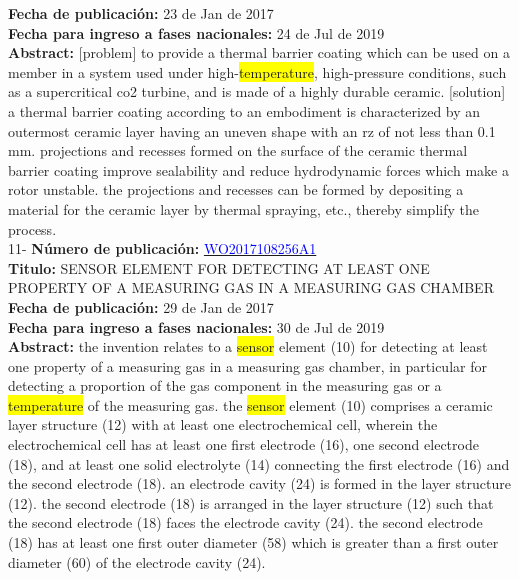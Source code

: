 \textbf{Fecha de publicación:} 23 de Jan de 2017\\ 
\textbf{Fecha para ingreso a fases nacionales:} 24 de Jul de 2019\\ 
\textbf{Abstract:} [problem] to provide a thermal barrier coating which can be used on a member in a system used under high-\colorbox{yellow}{temperature}, high-pressure conditions, such as a supercritical co2 turbine, and is made of a highly durable ceramic. [solution] a thermal barrier coating according to an embodiment is characterized by an outermost ceramic layer having an uneven shape with an rz of not less than 0.1 mm. projections and recesses formed on the surface of the ceramic thermal barrier coating improve sealability and reduce hydrodynamic forces which make a rotor unstable. the projections and recesses can be formed by depositing a material for the ceramic layer by thermal spraying, etc., thereby simplify the process.\\ 
 

 \vspace{1cm}11- \textbf{Número de publicación:} \href{https://worldwide.espacenet.com/publicationDetails/biblio?DB=EPODOC&II=0&ND=3&adjacent=true&locale=en_EP&FT=D&date=20160331&CC=WO&NR=2017108256A1&KC=A1#}{\textcolor{blue}{WO2017108256A1}}\\ 
\textbf{Titulo:} SENSOR ELEMENT FOR DETECTING AT LEAST ONE PROPERTY OF A MEASURING GAS IN A MEASURING GAS CHAMBER\\ 
 
\textbf{Fecha de publicación:} 29 de Jan de 2017\\ 
\textbf{Fecha para ingreso a fases nacionales:} 30 de Jul de 2019\\ 
\textbf{Abstract:} the invention relates to a \colorbox{yellow}{sensor} element (10) for detecting at least one property of a measuring gas in a measuring gas chamber, in particular for detecting a proportion of the gas component in the measuring gas or a \colorbox{yellow}{temperature} of the measuring gas. the \colorbox{yellow}{sensor} element (10) comprises a ceramic layer structure (12) with at least one electrochemical cell, wherein the electrochemical cell has at least one first electrode (16), one second electrode (18), and at least one solid electrolyte (14) connecting the first electrode (16) and the second electrode (18). an electrode cavity (24) is formed in the layer structure (12). the second electrode (18) is arranged in the layer structure (12) such that the second electrode (18) faces the electrode cavity (24). the second electrode (18) has at least one first outer diameter (58) which is greater than a first outer diameter (60) of the electrode cavity (24).\\ 
 
